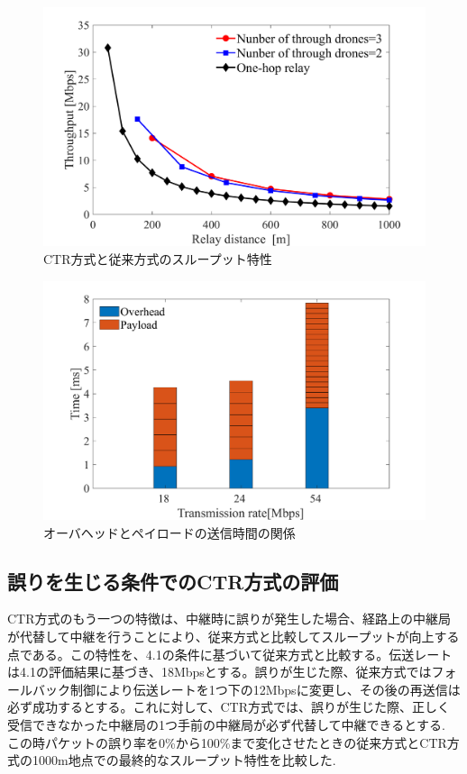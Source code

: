 \documentclass[a4paper,10.5pt]{ltjsarticle}
\begin{document}
\begin{figure}[H]
  \centering
  \includegraphics[width=\linewidth]{throughtput_vs_placement_50m_max_distance_3.pdf} %
  \caption{CTR方式と従来方式のスループット特性}
  \label{fig:throughput_through} %
\end{figure}
\begin{figure}[H]
  \centering
  \includegraphics[width=\linewidth]{throughtput_vs_placement_50m_max_distance_3_2.pdf} %
  \caption{オーバヘッドとペイロードの送信時間の関係}
  \label{fig:overhead_vs_paylord} %
\end{figure}

\clearpage
\subsection{誤りを生じる条件でのCTR方式の評価}
CTR方式のもう一つの特徴は、中継時に誤りが発生した場合、経路上の中継局が代替して中継を行うことにより、従来方式と比較してスループットが向上する点である。この特性を、4.1の条件に基づいて従来方式と比較する。伝送レートは4.1の評価結果に基づき、18Mbpsとする。誤りが生じた際、従来方式ではフォールバック制御により伝送レートを1つ下の12Mbpsに変更し、その後の再送信は必ず成功するとする。これに対して、CTR方式では、誤りが生じた際、正しく受信できなかった中継局の1つ手前の中継局が必ず代替して中継できるとする.
この時パケットの誤り率を0\%から100\%まで変化させたときの従来方式とCTR方式の1000m地点での最終的なスループット特性を比較した.
\end{document}
